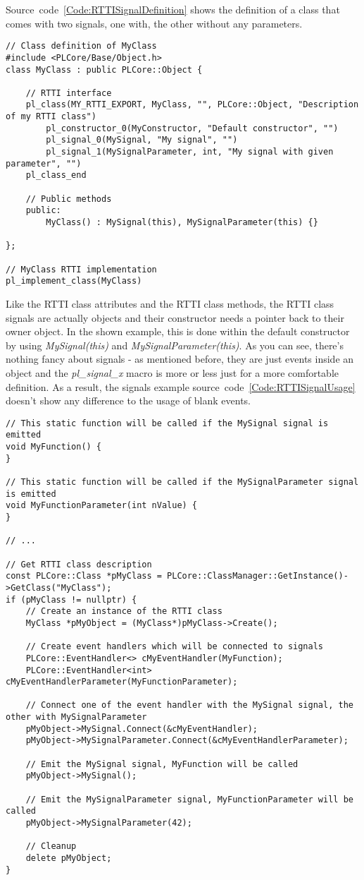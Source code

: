 Source~code~\ref{Code:RTTISignalDefinition} shows the definition of a class that comes with two signals, one with, the other without any parameters.
\begin{lstlisting}[label=Code:RTTISignalDefinition,caption={Defining a RTTI class with signals}]
// Class definition of MyClass
#include <PLCore/Base/Object.h>
class MyClass : public PLCore::Object {

	// RTTI interface
	pl_class(MY_RTTI_EXPORT, MyClass, "", PLCore::Object, "Description of my RTTI class")
		pl_constructor_0(MyConstructor, "Default constructor", "")
		pl_signal_0(MySignal, "My signal", "")
		pl_signal_1(MySignalParameter, int, "My signal with given parameter", "")
	pl_class_end

	// Public methods
	public:
		MyClass() : MySignal(this), MySignalParameter(this) {}

};

// MyClass RTTI implementation
pl_implement_class(MyClass)
\end{lstlisting}
Like the RTTI class attributes and the RTTI class methods, the RTTI class signals are actually objects and their constructor needs a pointer back to their owner object. In the shown example, this is done within the default constructor by using \emph{MySignal(this)} and \emph{MySignalParameter(this)}. As you can see, there's nothing fancy about signals - as mentioned before, they are just events inside an object and the \emph{pl\_signal\_x} macro is more or less just for a more comfortable definition. As a result, the signals example source~code~\ref{Code:RTTISignalUsage} doesn't show any difference to the usage of blank events.
\begin{lstlisting}[label=Code:RTTISignalUsage,caption={Using signals of a RTTI class}]
// This static function will be called if the MySignal signal is emitted
void MyFunction() {
}

// This static function will be called if the MySignalParameter signal is emitted
void MyFunctionParameter(int nValue) {
}

// ...

// Get RTTI class description
const PLCore::Class *pMyClass = PLCore::ClassManager::GetInstance()->GetClass("MyClass");
if (pMyClass != nullptr) {
	// Create an instance of the RTTI class
	MyClass *pMyObject = (MyClass*)pMyClass->Create();

	// Create event handlers which will be connected to signals
	PLCore::EventHandler<> cMyEventHandler(MyFunction);
	PLCore::EventHandler<int> cMyEventHandlerParameter(MyFunctionParameter);

	// Connect one of the event handler with the MySignal signal, the other with MySignalParameter
	pMyObject->MySignal.Connect(&cMyEventHandler);
	pMyObject->MySignalParameter.Connect(&cMyEventHandlerParameter);

	// Emit the MySignal signal, MyFunction will be called
	pMyObject->MySignal();

	// Emit the MySignalParameter signal, MyFunctionParameter will be called
	pMyObject->MySignalParameter(42);

	// Cleanup
	delete pMyObject;
}
\end{lstlisting}
